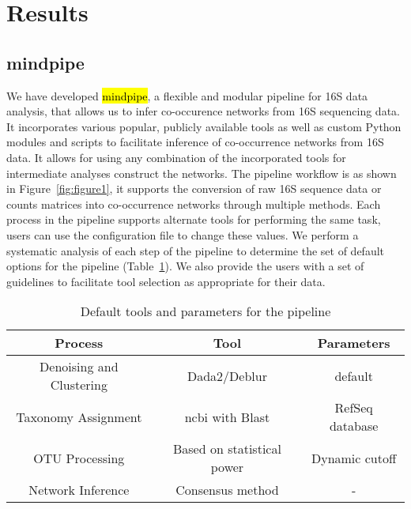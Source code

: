 
\section*{Results}

  \subsection*{mindpipe}

  We have developed \hl{mindpipe}, a flexible and modular pipeline for 16S data analysis, that allows us to infer co-occurence networks from 16S sequencing data.
  It incorporates various popular, publicly available tools as well as custom Python modules and scripts to facilitate inference of co-occurrence networks from 16S data.
  It allows for using any combination of the incorporated tools for intermediate analyses construct the networks.
  The pipeline workflow is as shown in Figure~\ref{fig:figure1}, it supports the conversion of raw 16S sequence data or counts matrices into co-occurrence networks through multiple methods.
  Each process in the pipeline supports alternate tools for performing the same task, users can use the configuration file to change these values.
  We perform a systematic analysis of each step of the pipeline to determine the set of default options for the pipeline (Table~\ref{tab:default_options}).
  We also provide the users with a set of guidelines to facilitate tool selection as appropriate for their data.

  \begin{table}[h]
    \centering
    \small
    \begin{tabular}{|c|c|c|}
      \hline
      \textbf{Process} & \textbf{Tool} & \textbf{Parameters} \\
      \hline
      Denoising and Clustering & Dada2/Deblur & default \\
      Taxonomy Assignment & \ac{ncbi} with Blast & RefSeq database \\
      OTU Processing & Based on statistical power & Dynamic cutoff \\
      Network Inference & Consensus method & - \\
      \hline
    \end{tabular}
    \caption{Default tools and parameters for the pipeline}
    \label{tab:default_options}
  \end{table}

